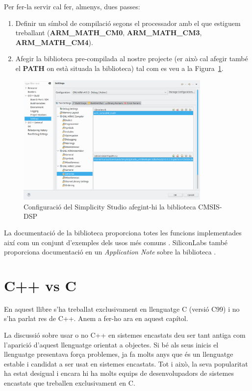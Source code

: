 Per fer-la servir cal fer, almenys, dues passes:
\begin{enumerate}
 \item Definir un símbol de compilació segons el processador amb el que estiguem treballant ({\bf ARM\_MATH\_CM0}, {\bf ARM\_MATH\_CM3}, {\bf ARM\_MATH\_CM4}).
 \item Afegir la biblioteca pre-compilada al nostre projecte (er això cal afegir també el {\bf PATH} on està situada la biblioteca) tal com es veu a la Figura~\ref{fig:EnableDSP}.
\end{enumerate}

\begin{figure}
 \centering
 \includegraphics[width=0.85\textwidth, keepaspectratio]{imatges/EnablingDSP_Lib.png}
 \caption{Configuració del Simplicity Studio afegint-hi la biblioteca CMSIS-DSP}
 \label{fig:EnableDSP}
\end{figure}

La documentació de la biblioteca proporciona totes les funcions implementades així com un conjunt d'exemples dels usos més comuns \cite{CORE-DSP}. SiliconLabs també proporciona documentació en un {\em Application Note} sobre la biblioteca \cite{AN0051}.

\chapter{C++ vs C}
\label{ch:CvsCPP}
En aquest llibre s'ha treballat exclusivament en llenguatge C (versió C99) i no s'ha parlat res de C++. Anem a fer-ho ara en aquest capítol.

La discussió sobre usar o no C++ en sistemes encastats deu ser tant antiga com l'aparició d'aquest llenguatge orientat a objectes. Si bé als seus inicis el llenguatge presentava força problemes, ja fa molts anys que és un llenguatge estable i candidat a ser usat en sistemes encastats. Tot i això, la seva popularitat ha estat desigual i encara hi ha molts equips de desenvolupadors de sistemes encastats que treballen exclusivament en C.

